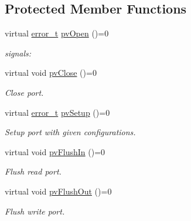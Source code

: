 \subsection*{Protected Member Functions}
\begin{DoxyCompactItemize}
\item 
virtual \hyperlink{classmdt_abstract_port_ad4121bb930c95887e77f8bafa065a85e}{error\_\-t} \hyperlink{classmdt_abstract_port_ac1440ea9759cbbee9efc5ea22afcdb0a}{pvOpen} ()=0
\begin{DoxyCompactList}\small\item\em signals: \end{DoxyCompactList}\item 
virtual void \hyperlink{classmdt_abstract_port_add29e91ccc4be62ab5c0dcb2a68ae8f0}{pvClose} ()=0
\begin{DoxyCompactList}\small\item\em Close port. \end{DoxyCompactList}\item 
virtual \hyperlink{classmdt_abstract_port_ad4121bb930c95887e77f8bafa065a85e}{error\_\-t} \hyperlink{classmdt_abstract_port_a880e5ae1699af102f9a80501bb6a0021}{pvSetup} ()=0
\begin{DoxyCompactList}\small\item\em Setup port with given configurations. \end{DoxyCompactList}\item 
virtual void \hyperlink{classmdt_abstract_port_a1fe88e9d56c0881b9566664b094b0958}{pvFlushIn} ()=0
\begin{DoxyCompactList}\small\item\em Flush read port. \end{DoxyCompactList}\item 
virtual void \hyperlink{classmdt_abstract_port_a1667fa938d3a7578b73f54c32015c369}{pvFlushOut} ()=0
\begin{DoxyCompactList}\small\item\em Flush write port. \end{DoxyCompactList}\end{DoxyCompactItemize}

